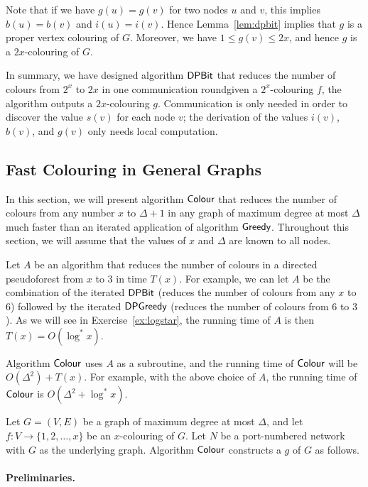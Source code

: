 Note that if we have $g(u) = g(v)$ for two nodes $u$ and $v$, this implies $b(u) = b(v)$ and $i(u) = i(v)$. Hence Lemma~\ref{lem:dpbit} implies that $g$ is a proper vertex colouring of $G$. Moreover, we have $1 \le g(v) \le 2x$, and hence $g$ is a $2x$-colouring of $G$.

In summary, we have designed algorithm $\textsf{DPBit}$ that reduces the number of colours from $2^x$ to $2x$ in one communication round\mydash given a $2^x$-colouring $f$, the algorithm outputs a $2x$-colouring $g$. Communication is only needed in order to discover the value $s(v)$ for each node $v$; the derivation of the values $i(v)$, $b(v)$, and $g(v)$ only needs local computation.


\subsection{Fast Colouring in General Graphs}\label{ssec:colour}

In this section, we will present algorithm $\textsf{Colour}$ that reduces the number of colours from any number $x$ to $\Delta+1$ in any graph of maximum degree at most $\Delta$ much faster than an iterated application of algorithm $\textsf{Greedy}$. Throughout this section, we will assume that the values of $x$ and $\Delta$ are known to all nodes.

Let $A$ be an algorithm that reduces the number of colours in a directed pseudoforest from $x$ to $3$ in time $T(x)$. For example, we can let $A$ be the combination of the iterated $\textsf{DPBit}$ (reduces the number of colours from any $x$ to $6$) followed by the iterated $\textsf{DPGreedy}$ (reduces the number of colours from $6$ to $3$). As we will see in Exercise~\ref{ex:logstar}, the running time of $A$ is then $T(x) = O(\log^* x)$.

Algorithm $\textsf{Colour}$ uses $A$ as a subroutine, and the running time of $\textsf{Colour}$ will be $O(\Delta^2) + T(x)$. For example, with the above choice of $A$, the running time of $\textsf{Colour}$ is $O(\Delta^2 + \log^* x)$.

Let $G = (V,E)$ be a graph of maximum degree at most $\Delta$, and let $f \colon V \to \{1,2,\dotsc,x\}$ be an $x$-colouring of $G$. Let $N$ be a port-numbered network with $G$ as the underlying graph. Algorithm $\textsf{Colour}$ constructs a \Dpocol{} $g$ of $G$ as follows.

\paragraph{Preliminaries.}

